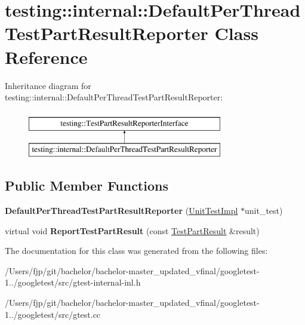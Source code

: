 \hypertarget{classtesting_1_1internal_1_1_default_per_thread_test_part_result_reporter}{}\section{testing\+:\+:internal\+:\+:Default\+Per\+Thread\+Test\+Part\+Result\+Reporter Class Reference}
\label{classtesting_1_1internal_1_1_default_per_thread_test_part_result_reporter}
Inheritance diagram for testing\+:\+:internal\+:\+:Default\+Per\+Thread\+Test\+Part\+Result\+Reporter\+:\begin{figure}[H]
\begin{center}
\leavevmode
\includegraphics[height=2.000000cm]{classtesting_1_1internal_1_1_default_per_thread_test_part_result_reporter}
\end{center}
\end{figure}
\subsection*{Public Member Functions}
\begin{DoxyCompactItemize}
\item 
\mbox{\label{classtesting_1_1internal_1_1_default_per_thread_test_part_result_reporter_a968a846e5a90d2ffea8b2ce2746099bd}} 
{\bfseries Default\+Per\+Thread\+Test\+Part\+Result\+Reporter} (\mbox{\hyperlink{classtesting_1_1internal_1_1_unit_test_impl}{Unit\+Test\+Impl}} $\ast$unit\+\_\+test)
\item 
\mbox{\label{classtesting_1_1internal_1_1_default_per_thread_test_part_result_reporter_ac6dc08eadc4e5a2a64a91d0b6c6b3aad}} 
virtual void {\bfseries Report\+Test\+Part\+Result} (const \mbox{\hyperlink{classtesting_1_1_test_part_result}{Test\+Part\+Result}} \&result)
\end{DoxyCompactItemize}


The documentation for this class was generated from the following files\+:\begin{DoxyCompactItemize}
\item 
/\+Users/fjp/git/bachelor/bachelor-\/master\+\_\+updated\+\_\+vfinal/googletest-\/1../googletest/src/gtest-\/internal-\/inl.\+h\item 
/\+Users/fjp/git/bachelor/bachelor-\/master\+\_\+updated\+\_\+vfinal/googletest-\/1../googletest/src/gtest.\+cc\end{DoxyCompactItemize}
